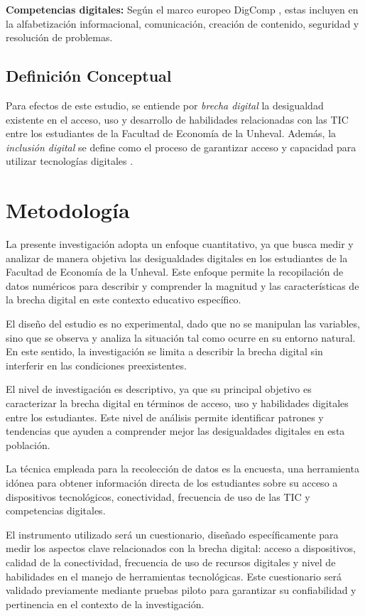 \documentclass[12pt, a4paper]{article}
\begin{document}
\textbf{Competencias digitales:} Según el marco europeo DigComp \parencite{ferrari2013}, estas incluyen en la alfabetización informacional, comunicación, creación de contenido, seguridad y resolución de problemas.

\subsection{Definición Conceptual}

Para efectos de este estudio, se entiende por \textit{brecha digital} la desigualdad existente en el acceso, uso y desarrollo de habilidades relacionadas con las TIC entre los estudiantes de la Facultad de Economía de la Unheval. Además, la \textit{inclusión digital} se define como el proceso de garantizar acceso y capacidad para utilizar tecnologías digitales \parencite{unesco2019}.


\section{Metodología}

La presente investigación adopta un enfoque cuantitativo, ya que busca medir y analizar de manera objetiva las desigualdades digitales en los estudiantes de la Facultad de Economía de la Unheval. Este enfoque permite la recopilación de datos numéricos para describir y comprender la magnitud y las características de la brecha digital en este contexto educativo específico.  

El diseño del estudio es no experimental, dado que no se manipulan las variables, sino que se observa y analiza la situación tal como ocurre en su entorno natural. En este sentido, la investigación se limita a describir la brecha digital sin interferir en las condiciones preexistentes.  

El nivel de investigación es descriptivo, ya que su principal objetivo es caracterizar la brecha digital en términos de acceso, uso y habilidades digitales entre los estudiantes. Este nivel de análisis permite identificar patrones y tendencias que ayuden a comprender mejor las desigualdades digitales en esta población.  

La técnica empleada para la recolección de datos es la encuesta, una herramienta idónea para obtener información directa de los estudiantes sobre su acceso a dispositivos tecnológicos, conectividad, frecuencia de uso de las TIC y competencias digitales.  

El instrumento utilizado será un cuestionario, diseñado específicamente para medir los aspectos clave relacionados con la brecha digital: acceso a dispositivos, calidad de la conectividad, frecuencia de uso de recursos digitales y nivel de habilidades en el manejo de herramientas tecnológicas. Este cuestionario será validado previamente mediante pruebas piloto para garantizar su confiabilidad y pertinencia en el contexto de la investigación.  
\end{document}
